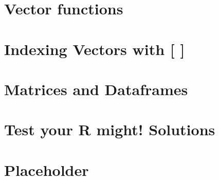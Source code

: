 \documentclass[]{book}
\begin{document}
\chapter{Vector functions}\label{vectorfunctions}

\chapter{Indexing Vectors with {[} {]}}\label{vectorindexing}

\chapter{Matrices and Dataframes}\label{matricesdataframes}

\chapter{Test your R might!
Solutions}\label{test-your-r-might-solutions}

\chapter{Placeholder}\label{placeholder}


\end{document}
